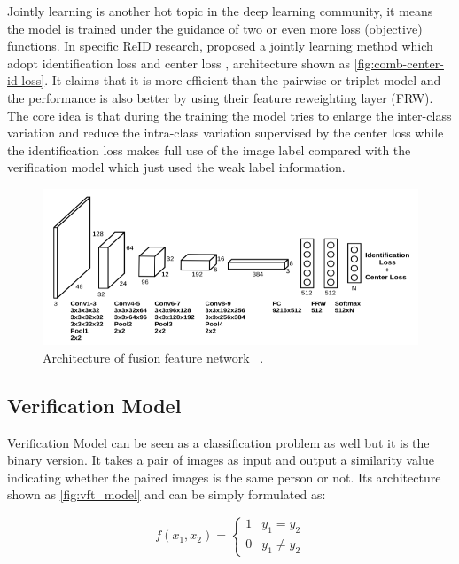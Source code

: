 Jointly learning is another hot topic in the deep learning community, it means the model is trained under
the guidance of two or even more loss (objective) functions. In specific ReID research,
\cite{comb-id-and-center-loss-2017} proposed a jointly learning method which adopt
identification loss and center loss \cite{center-loss-2016}, architecture shown as
\autoref{fig:comb-center-id-loss}. It claims that it is more efficient than the
pairwise or triplet model and the performance is also better by using their feature reweighting
layer (FRW). The core idea is that during the training the model tries to enlarge the inter-class variation
and reduce the intra-class variation supervised by the center loss while
the identification loss makes full use of the image label compared with the verification model which
just used the weak label information.

\begin{figure}
    \includegraphics[width=\linewidth]{figures/comb-center-id-loss.png}
    \caption{Architecture of fusion feature network ~\protect\cite{comb-id-and-center-loss-2017}.}
    \label{fig:comb-center-id-loss}
\end{figure}

\subsection{Verification Model}

Verification Model can be seen as a classification problem as well but it is the binary version. It takes a
pair of images as input and output a similarity value indicating whether the paired images is the same
person or not. Its architecture shown as \autoref{fig:vft_model} and can be simply formulated as:

$$
f(x_1, x_2) =
\begin{cases}
1&  y_1 = y_2 \\
0&    y_1 \neq y_2
\end{cases}
$$

